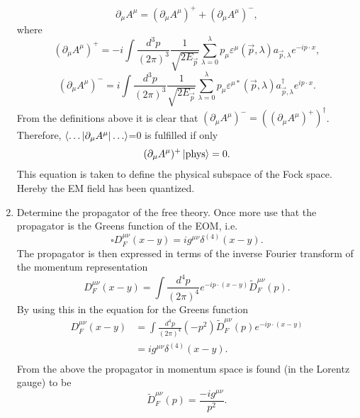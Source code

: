 \begin{enumerate}
	\begin{equation}
		\partial_\mu A^\mu=(\partial_\mu A^\mu)^++(\partial_\mu A^\mu)^-,
	\end{equation} 
	where
	\begin{equation}
		(\partial_\mu A^\mu)^+=-i\int \frac{d^3p}{(2\pi)^3}\frac{1}{\sqrt{2E_{\vec{p}}}}\sum_{\lambda=0}^{\lambda}p_\mu\varepsilon^\mu(\vec{p},\lambda)a_{\vec{p},\lambda}e^{-ip\cdot x},
	\end{equation} 
	\begin{equation}
		(\partial_\mu A^\mu)^-=i\int \frac{d^3p}{(2\pi)^3}\frac{1}{\sqrt{2E_{\vec{p}}}}\sum_{\lambda=0}^{\lambda}p_\mu\varepsilon^{\mu*}(\vec{p},\lambda)a_{\vec{p},\lambda}^\dagger e^{ip\cdot x}.
	\end{equation} 
	From the definitions above it is clear that $(\partial_\mu A^\mu)^-=((\partial_\mu A^\mu)^+)^\dagger$. Therefore, $\braket{\dots|\partial_\mu A^\mu|\dots}$=0 is fulfilled if only
	\begin{equation}
		(\partial_\mu A^\mu)^+\ket{\text{phys}}=0.
	\end{equation} 
	This equation is taken to define the physical subspace of the Fock space. Hereby the EM field has been quantized.
	
	\item Determine the propagator of the free theory. Once more use that the propagator is the Greens function of the EOM,  i.e.
	\begin{equation}
		\square D_F^{\mu\nu}(x-y)=ig^{\mu\nu}\delta^{(4)}(x-y).
	\end{equation} 
	The propagator is then expressed in terms of the inverse Fourier transform of the momentum representation
	\begin{equation}
		D_F^{\mu\nu}(x-y)=\int \frac{d^4p}{(2\pi)^4}e^{-ip\cdot (x-y)}\tilde{D}_F^{\mu\nu}(p).
	\end{equation} 
	By using this in the equation for the Greens function
	\begin{equation}
		\begin{split}
			D_F^{\mu\nu}(x-y)&=\int \frac{d^4p}{(2\pi)^4}(-p^2)\tilde{D}_F^{\mu\nu}(p)e^{-ip\cdot (x-y)}\\
			&=ig^{\mu\nu}\delta^{(4)}(x-y).\\
		\end{split}
	\end{equation} 
	From the above the propagator in momentum space is found (in the Lorentz gauge) to be
	\begin{equation}
		\tilde{D}_F^{\mu\nu}(p)=\frac{-ig^{\mu\nu}}{p^2}.
	\end{equation} 
	
\end{enumerate}

